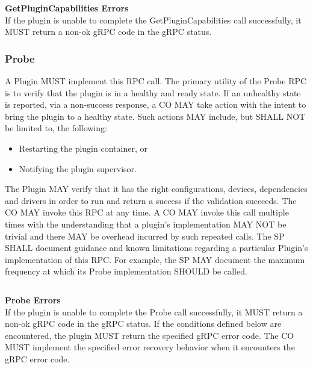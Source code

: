 \documentclass[12pt]{article}
\begin{document}
\inputminted[breaklines,frame=lines,linenos,fontsize=\footnotesize]{proto}{src/getplugincapabilites.proto}

{\bfseries{GetPluginCapabilities Errors}} \\

If the plugin is unable to complete the GetPluginCapabilities call
successfully, it MUST return a non-ok gRPC code in the gRPC status.


\subsubsection{Probe}
A Plugin MUST implement this RPC call. The primary utility of the Probe
RPC is to verify that the plugin is in a healthy and ready state. If an
unhealthy state is reported, via a non-success response, a CO MAY take
action with the intent to bring the plugin to a healthy state. Such
actions MAY include, but SHALL NOT be limited to, the following:

\begin{itemize}
  \item Restarting the plugin container, or
  \item Notifying the plugin supervisor.
\end{itemize}

The Plugin MAY verify that it has the right configurations, devices,
dependencies and drivers in order to run and return a success if the
validation succeeds. The CO MAY invoke this RPC at any time. A CO MAY
invoke this call multiple times with the understanding that a plugin's
implementation MAY NOT be trivial and there MAY be overhead incurred by
such repeated calls. The SP SHALL document guidance and known
limitations regarding a particular Plugin's implementation of this RPC.
For example, the SP MAY document the maximum frequency at which its
Probe implementation SHOULD be called.

\inputminted[breaklines,frame=lines,linenos,fontsize=\footnotesize]{proto}{src/probe.proto}

{\bfseries{Probe Errors}} \\

If the plugin is unable to complete the Probe call successfully, it MUST
return a non-ok gRPC code in the gRPC status. If the conditions defined
below are encountered, the plugin MUST return the specified gRPC error
code. The CO MUST implement the specified error recovery behavior when
it encounters the gRPC error code.
\end{document}
